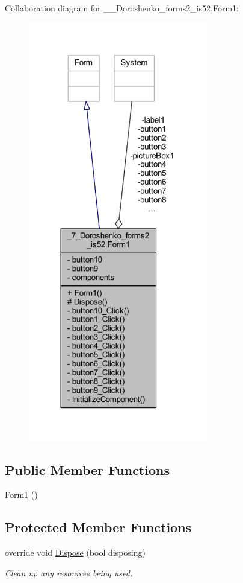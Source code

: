 Collaboration diagram for \+\_\+\_\+\+Doroshenko\+\_\+forms2\+\_\+is52.\+Form1\+:
\nopagebreak
\begin{figure}[H]
\begin{center}
\leavevmode
\includegraphics[width=222pt]{class__7___doroshenko__forms2__is52_1_1_form1__coll__graph}
\end{center}
\end{figure}
\subsection*{Public Member Functions}
\begin{DoxyCompactItemize}
\item 
\hyperlink{class__7___doroshenko__forms2__is52_1_1_form1_a66d5ff09b3dc106a9b16fbc07c4033a4}{Form1} ()
\end{DoxyCompactItemize}
\subsection*{Protected Member Functions}
\begin{DoxyCompactItemize}
\item 
override void \hyperlink{class__7___doroshenko__forms2__is52_1_1_form1_a17a7efc8a9302b187d39fd24d80c65ee}{Dispose} (bool disposing)
\begin{DoxyCompactList}\small\item\em Clean up any resources being used. \end{DoxyCompactList}\end{DoxyCompactItemize}
